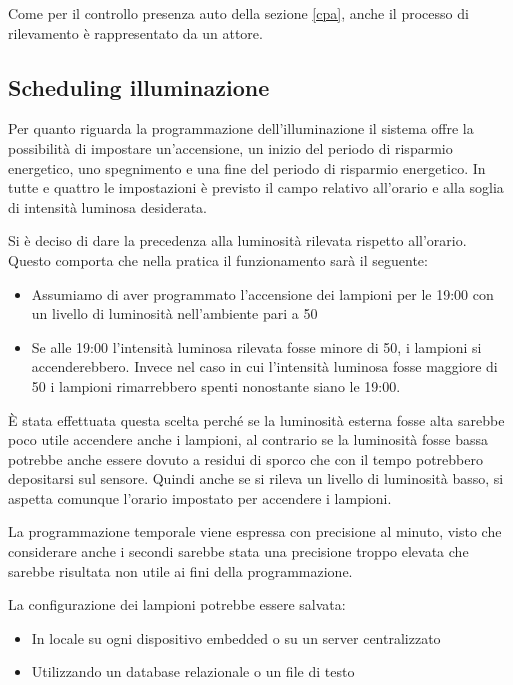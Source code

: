 Come per il controllo presenza auto della sezione \ref{cpa}, anche il processo di rilevamento è rappresentato da un attore.


\subsection{Scheduling illuminazione \label{si}}

Per quanto riguarda la programmazione dell'illuminazione il sistema offre la possibilità di impostare un'accensione, un inizio del periodo di risparmio energetico, uno spegnimento e una fine del periodo di risparmio energetico.
In tutte e quattro le impostazioni è previsto il campo relativo all'orario e alla soglia di intensità luminosa desiderata.

Si è deciso di dare la precedenza alla luminosità rilevata rispetto all'orario.
Questo comporta che nella pratica il funzionamento sarà il seguente:
\begin{itemize}
	\item Assumiamo di aver programmato l'accensione dei lampioni per le 19:00 con un livello di luminosità nell'ambiente pari a 50
	\item Se alle 19:00 l'intensità luminosa rilevata fosse minore di 50, i lampioni si accenderebbero.
	Invece nel caso in cui l'intensità luminosa fosse maggiore di 50 i lampioni rimarrebbero spenti nonostante siano le 19:00.
\end{itemize}

È stata effettuata questa scelta perché se la luminosità esterna fosse alta sarebbe poco utile accendere anche i lampioni, al contrario se la luminosità fosse bassa potrebbe anche essere dovuto a residui di sporco che con il tempo potrebbero depositarsi sul sensore.
Quindi anche se si rileva un livello di luminosità basso, si aspetta comunque l'orario impostato per accendere i lampioni.

La programmazione temporale viene espressa con precisione al minuto, visto che considerare anche i secondi sarebbe stata una precisione troppo elevata che sarebbe risultata non utile ai fini della programmazione.

La configurazione dei lampioni potrebbe essere salvata:
\begin{itemize}
	\item In locale su ogni dispositivo embedded o su un server centralizzato
	\item Utilizzando un database relazionale o un file di testo
\end{itemize}

